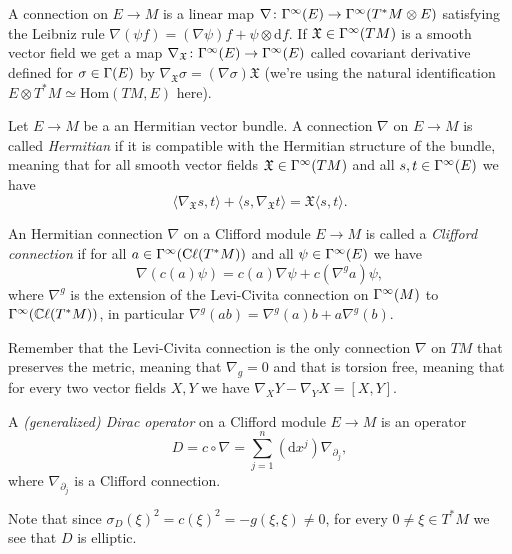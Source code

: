 \begin{definition}
 A connection on $E\to M$ is a linear map $\nabla\colon\Gamma^\infty(E)\to\Gamma^\infty(T^\ast M\otimes E)$ satisfying the Leibniz rule $\nabla (\psi f)=(\nabla\psi)f+\psi\otimes\mathrm{d}f$. If $\mathfrak X\in\Gamma^\infty(TM)$ is a smooth vector field we get a map $\nabla_{\mathfrak{X}}\colon\Gamma^\infty(E)\to\Gamma^\infty(E)$ called covariant derivative defined for $\sigma\in\Gamma(E)$ by $\nabla_{\mathfrak X}\sigma=(\nabla\sigma)\mathfrak X$ (we're using the natural identification $E\otimes T^\ast M\simeq\mathrm{Hom}(TM,E)$ here).
\end{definition}
\begin{definition}
 Let $E\to M$ be a an Hermitian vector bundle. A connection $\nabla$ on $E\to M$ is called \emph{Hermitian} if it is compatible with the Hermitian structure of the bundle, meaning that for all smooth vector fields $\mathfrak X\in\Gamma^\infty(TM)$ and all $s,t\in\Gamma^\infty(E)$ we have $$\langle\nabla_{\mathfrak X}s,t\rangle+\langle s,\nabla_{\mathfrak X} t\rangle=\mathfrak X\langle s,t\rangle.$$
\end{definition}

\begin{definition}
 An Hermitian connection $\nabla$ on a Clifford module $E\to M$ is called a \emph{Clifford connection} if for all $a\in\Gamma^\infty(\mathrm{C}\ell(T^\ast M))$ and all $\psi\in\Gamma^\infty(E)$ we have $$\nabla(c(a)\psi)=c(a)\nabla\psi+c(\nabla^ga)\psi,$$ where $\nabla^g$ is the extension of the Levi-Civita connection on $\Gamma^\infty(M)$ to $\Gamma^\infty(\mathbb{C}\ell(T^\ast M))$, in particular $\nabla^g(ab)=\nabla^g(a)b+a\nabla^g(b)$. 
\end{definition}

\noindent Remember that the Levi-Civita connection is the only connection $\nabla$ on $TM$ that preserves the metric, meaning that $\nabla_g=0$ and that is torsion free, meaning that for every two vector fields $X,Y$ we have $\nabla_XY-\nabla_YX=[X,Y]$.

\begin{definition}
 A \emph{(generalized) Dirac operator} on a Clifford module $E\to M$ is an operator $$D=c\circ\nabla=\sum_{j=1}^n(\mathrm{d}x^j)\nabla_{\partial_j},$$ where $\nabla_{\partial_j}$ is a Clifford connection.
\end{definition}

\noindent Note that since $\sigma_D(\xi)^2=c(\xi)^2=-g(\xi,\xi)\neq 0$, for every $0\neq\xi\in T^\ast M$ we see that $D$ is elliptic.


